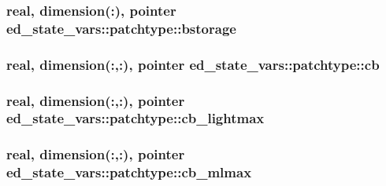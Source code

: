 \subsubsection[{\texorpdfstring{bstorage}{bstorage}}]{\setlength{\rightskip}{0pt plus 5cm}real, dimension(\+:), pointer ed\+\_\+state\+\_\+vars\+::patchtype\+::bstorage}\hypertarget{structed__state__vars_1_1patchtype_a803d5082ee74b7883d539d0a13bfdde7}{}\label{structed__state__vars_1_1patchtype_a803d5082ee74b7883d539d0a13bfdde7}
\subsubsection[{\texorpdfstring{cb}{cb}}]{\setlength{\rightskip}{0pt plus 5cm}real, dimension(\+:,\+:), pointer ed\+\_\+state\+\_\+vars\+::patchtype\+::cb}\hypertarget{structed__state__vars_1_1patchtype_a40864ee1bbf9e5d7e3cb0f15e390f42b}{}\label{structed__state__vars_1_1patchtype_a40864ee1bbf9e5d7e3cb0f15e390f42b}
\subsubsection[{\texorpdfstring{cb\+\_\+lightmax}{cb_lightmax}}]{\setlength{\rightskip}{0pt plus 5cm}real, dimension(\+:,\+:), pointer ed\+\_\+state\+\_\+vars\+::patchtype\+::cb\+\_\+lightmax}\hypertarget{structed__state__vars_1_1patchtype_ae0a66dd1158f29915e35555d028df93d}{}\label{structed__state__vars_1_1patchtype_ae0a66dd1158f29915e35555d028df93d}
\subsubsection[{\texorpdfstring{cb\+\_\+mlmax}{cb_mlmax}}]{\setlength{\rightskip}{0pt plus 5cm}real, dimension(\+:,\+:), pointer ed\+\_\+state\+\_\+vars\+::patchtype\+::cb\+\_\+mlmax}\hypertarget{structed__state__vars_1_1patchtype_afc5b892b64461db76f841e73ce0eeb85}{}\label{structed__state__vars_1_1patchtype_afc5b892b64461db76f841e73ce0eeb85}
